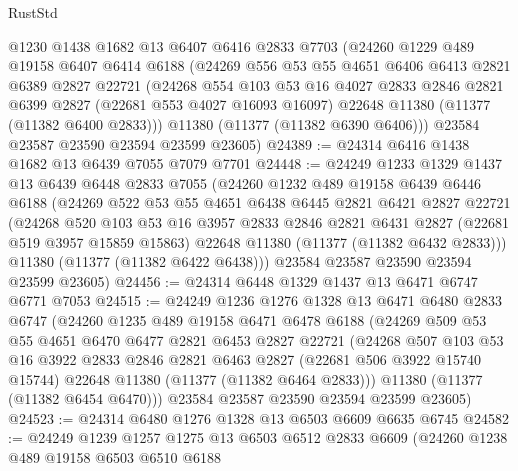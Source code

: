 \begin{lexlean}{RustStd}
\begin{coremodule}
    @1230
    @1438
    @1682
    @13
    @6407
    @6416
    @2833
    @7703
    (@24260
      @1229
      @489
      @19158
      @6407
      @6414
      @6188
      (@24269
        @556
        @53
        @55
        @4651
        @6406
        @6413
        @2821
        @6389
        @2827
        @22721
        (@24268
          @554
          @103
          @53
          @16
          @4027
          @2833
          @2846
          @2821
          @6399
          @2827
          (@22681 @553 @4027 @16093 @16097)
          @22648
          @11380
          (@11377 (@11382 @6400 @2833)))
        @11380
        (@11377 (@11382 @6390 @6406)))
      @23584
      @23587
      @23590
      @23594
      @23599
      @23605)
@24389 := @24314 @6416 @1438 @1682 @13 @6439 @7055 @7079 @7701
@24448 := @24249
    @1233
    @1329
    @1437
    @13
    @6439
    @6448
    @2833
    @7055
    (@24260
      @1232
      @489
      @19158
      @6439
      @6446
      @6188
      (@24269
        @522
        @53
        @55
        @4651
        @6438
        @6445
        @2821
        @6421
        @2827
        @22721
        (@24268
          @520
          @103
          @53
          @16
          @3957
          @2833
          @2846
          @2821
          @6431
          @2827
          (@22681 @519 @3957 @15859 @15863)
          @22648
          @11380
          (@11377 (@11382 @6432 @2833)))
        @11380
        (@11377 (@11382 @6422 @6438)))
      @23584
      @23587
      @23590
      @23594
      @23599
      @23605)
@24456 := @24314 @6448 @1329 @1437 @13 @6471 @6747 @6771 @7053
@24515 := @24249
    @1236
    @1276
    @1328
    @13
    @6471
    @6480
    @2833
    @6747
    (@24260
      @1235
      @489
      @19158
      @6471
      @6478
      @6188
      (@24269
        @509
        @53
        @55
        @4651
        @6470
        @6477
        @2821
        @6453
        @2827
        @22721
        (@24268
          @507
          @103
          @53
          @16
          @3922
          @2833
          @2846
          @2821
          @6463
          @2827
          (@22681 @506 @3922 @15740 @15744)
          @22648
          @11380
          (@11377 (@11382 @6464 @2833)))
        @11380
        (@11377 (@11382 @6454 @6470)))
      @23584
      @23587
      @23590
      @23594
      @23599
      @23605)
@24523 := @24314 @6480 @1276 @1328 @13 @6503 @6609 @6635 @6745
@24582 := @24249
    @1239
    @1257
    @1275
    @13
    @6503
    @6512
    @2833
    @6609
    (@24260
      @1238
      @489
      @19158
      @6503
      @6510
      @6188

\end{coremodule}
\end{lexlean}
